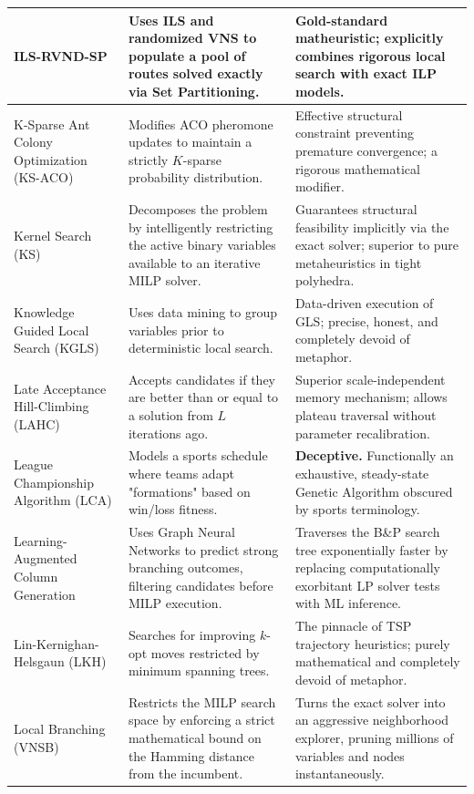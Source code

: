 \documentclass[orivec,runningheads]{llncs}
\begin{document}
\begin{center}
\begin{longtable}
\begin{center}
\begin{longtable}{
  >{\raggedright\arraybackslash}p{}
  >{\raggedright\arraybackslash}p{}
  >{\raggedright\arraybackslash}p{}
}
ILS-RVND-SP & Uses ILS and randomized VNS to populate a pool of routes solved exactly via Set Partitioning. & Gold-standard matheuristic; explicitly combines rigorous local search with exact ILP models. \\ \midrule

K-Sparse Ant Colony Optimization (KS-ACO) & Modifies ACO pheromone updates to maintain a strictly $K$-sparse probability distribution. & Effective structural constraint preventing premature convergence; a rigorous mathematical modifier. \\ \midrule

Kernel Search (KS) & Decomposes the problem by intelligently restricting the active binary variables available to an iterative MILP solver. & Guarantees structural feasibility implicitly via the exact solver; superior to pure metaheuristics in tight polyhedra. \\ \midrule

Knowledge Guided Local Search (KGLS) & Uses data mining to group variables prior to deterministic local search. & Data-driven execution of GLS; precise, honest, and completely devoid of metaphor. \\ \midrule

Late Acceptance Hill-Climbing (LAHC) & Accepts candidates if they are better than or equal to a solution from $L$ iterations ago. & Superior scale-independent memory mechanism; allows plateau traversal without parameter recalibration. \\ \midrule

League Championship Algorithm (LCA) & Models a sports schedule where teams adapt "formations" based on win/loss fitness. & \textbf{Deceptive.} Functionally an exhaustive, steady-state Genetic Algorithm obscured by sports terminology. \\ \midrule

Learning-Augmented Column Generation & Uses Graph Neural Networks to predict strong branching outcomes, filtering candidates before MILP execution. & Traverses the B\&P search tree exponentially faster by replacing computationally exorbitant LP solver tests with ML inference. \\ \midrule

Lin-Kernighan-Helsgaun (LKH) & Searches for improving $k$-opt moves restricted by minimum spanning trees. & The pinnacle of TSP trajectory heuristics; purely mathematical and completely devoid of metaphor. \\ \midrule

Local Branching (VNSB) & Restricts the MILP search space by enforcing a strict mathematical bound on the Hamming distance from the incumbent. & Turns the exact solver into an aggressive neighborhood explorer, pruning millions of variables and nodes instantaneously. \\ \midrule


\end{longtable}
\end{center}
\end{longtable}
\end{center}
\end{document}
